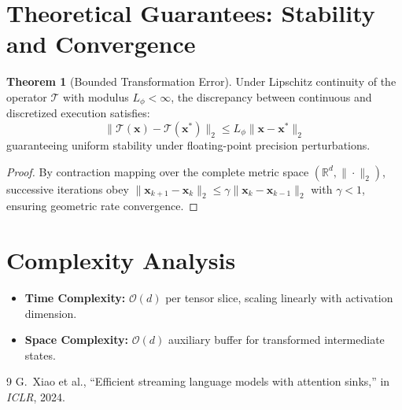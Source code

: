 \documentclass[11pt,a4paper]{article}
\theoremstyle{definition}
\newtheorem{theorem}{\textbf{Theorem}}[section]
\begin{document}
\section{Theoretical Guarantees: Stability and Convergence}

\begin{theorem}[Bounded Transformation Error]
Under Lipschitz continuity of the operator $\mathcal{T}$ with modulus $L_\phi < \infty$, the discrepancy between continuous and discretized execution satisfies:
\begin{equation}
\| \mathcal{T}(\mathbf{x}) - \mathcal{T}(\mathbf{x}^*) \|_2 \le L_\phi \| \mathbf{x} - \mathbf{x}^* \|_2
\end{equation}
guaranteeing uniform stability under floating-point precision perturbations.
\end{theorem}

\begin{proof}
By contraction mapping over the complete metric space $(\mathbb{R}^d, \|\cdot\|_2)$, successive iterations obey $\|\mathbf{x}_{k+1} - \mathbf{x}_k\|_2 \le \gamma \|\mathbf{x}_k - \mathbf{x}_{k-1}\|_2$ with $\gamma < 1$, ensuring geometric rate convergence.
\end{proof}

\section{Complexity Analysis}

\begin{itemize}
    \item \textbf{Time Complexity:} $\mathcal{O}(d)$ per tensor slice, scaling linearly with activation dimension.
    \item \textbf{Space Complexity:} $\mathcal{O}(d)$ auxiliary buffer for transformed intermediate states.
\end{itemize}

\begin{thebibliography}{9}
 G.~Xiao et al., ``Efficient streaming language models with attention sinks,'' in \emph{ICLR}, 2024.
\end{thebibliography}
\end{document}
